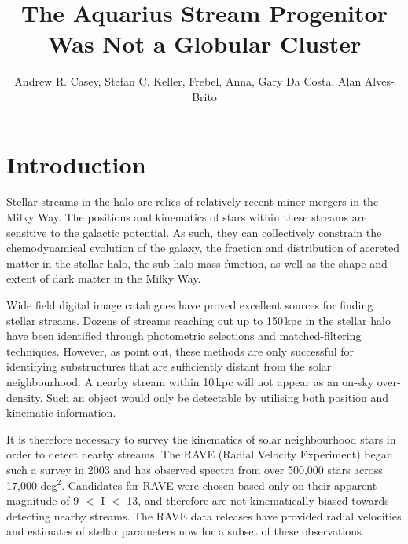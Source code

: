 \documentclass{emulateapj}
\begin{document}
\title{The Aquarius Stream Progenitor Was Not a Globular Cluster}


\author{Andrew R. Casey, Stefan C. Keller, Frebel, Anna, Gary Da Costa, Alan Alves-Brito}


\begin{abstract}
\end{abstract}


\section{Introduction}

Stellar streams in the halo are relics of relatively recent minor mergers in the Milky Way. The positions and kinematics of stars within these streams are sensitive to the galactic potential. As such, they can collectively constrain the chemodynamical evolution of the galaxy, the fraction and distribution of accreted matter in the stellar halo, the sub-halo mass function, as well as the shape and extent of dark matter in the Milky Way. 

Wide field digital image catalogues have proved excellent sources for finding stellar streams. Dozens of streams reaching out up to 150\,kpc in the stellar halo have been identified through photometric selections and matched-filtering techniques. However, as \citet{Helmi;et-al_1999} point out, these methods are only successful for identifying substructures that are sufficiently distant from the solar neighbourhood. A nearby stream within 10\,kpc will not appear as an on-sky over-density. Such an object would only be detectable by utilising both position and kinematic information. 

It is therefore necessary to survey the kinematics of solar neighbourhood stars in order to detect nearby streams. The RAVE (Radial Velocity Experiment) began such a survey in 2003 and has observed spectra from over 500,000 stars across 17,000 deg$^{2}$. Candidates for RAVE were chosen based only on their apparent magnitude of 9 $<$ I $<$ 13, and therefore are not kinematically biased towards detecting nearby streams. The RAVE data releases have provided radial velocities \citep{Steinmetz;et-al_2006} and estimates of stellar parameters \citep{Zwitter;et-al_2008, Siebert;et-al_2011} now for a subset of these observations. 
\end{document}
